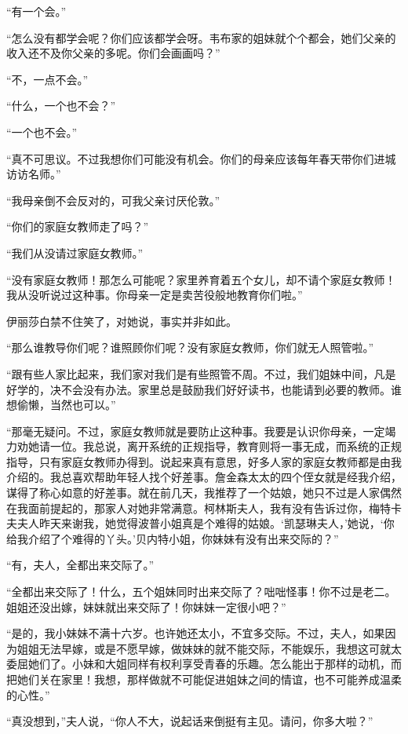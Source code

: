 \par “有一个会。”
\par “怎么没有都学会呢？你们应该都学会呀。韦布家的姐妹就个个都会，她们父亲的收入还不及你父亲的多呢。你们会画画吗？”
\par “不，一点不会。”
\par “什么，一个也不会？”
\par “一个也不会。”
\par “真不可思议。不过我想你们可能没有机会。你们的母亲应该每年春天带你们进城访访名师。”
\par “我母亲倒不会反对的，可我父亲讨厌伦敦。”
\par “你们的家庭女教师走了吗？”
\par “我们从没请过家庭女教师。”
\par “没有家庭女教师！那怎么可能呢？家里养育着五个女儿，却不请个家庭女教师！我从没听说过这种事。你母亲一定是卖苦役般地教育你们啦。”
\par 伊丽莎白禁不住笑了，对她说，事实并非如此。
\par “那么谁教导你们呢？谁照顾你们呢？没有家庭女教师，你们就无人照管啦。”
\par “跟有些人家比起来，我们家对我们是有些照管不周。不过，我们姐妹中间，凡是好学的，决不会没有办法。家里总是鼓励我们好好读书，也能请到必要的教师。谁想偷懒，当然也可以。”
\par “那毫无疑问。不过，家庭女教师就是要防止这种事。我要是认识你母亲，一定竭力劝她请一位。我总说，离开系统的正规指导，教育则将一事无成，而系统的正规指导，只有家庭女教师办得到。说起来真有意思，好多人家的家庭女教师都是由我介绍的。我总喜欢帮助年轻人找个好差事。詹金森太太的四个侄女就是经我介绍，谋得了称心如意的好差事。就在前几天，我推荐了一个姑娘，她只不过是人家偶然在我面前提起的，那家人对她非常满意。柯林斯夫人，我有没有告诉过你，梅特卡夫夫人昨天来谢我，她觉得波普小姐真是个难得的姑娘。‘凯瑟琳夫人，’她说，‘你给我介绍了个难得的丫头。’贝内特小姐，你妹妹有没有出来交际的？”
\par “有，夫人，全都出来交际了。”
\par “全都出来交际了！什么，五个姐妹同时出来交际了？咄咄怪事！你不过是老二。姐姐还没出嫁，妹妹就出来交际了！你妹妹一定很小吧？”
\par “是的，我小妹妹不满十六岁。也许她还太小，不宜多交际。不过，夫人，如果因为姐姐无法早嫁，或是不愿早嫁，做妹妹的就不能交际，不能娱乐，我想这可就太委屈她们了。小妹和大姐同样有权利享受青春的乐趣。怎么能出于那样的动机，而把她们关在家里！我想，那样做就不可能促进姐妹之间的情谊，也不可能养成温柔的心性。”
\par “真没想到，”夫人说，“你人不大，说起话来倒挺有主见。请问，你多大啦？”
